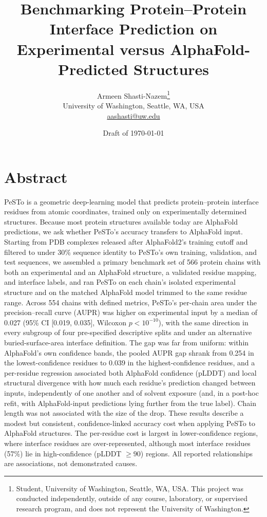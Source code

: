 \documentclass[10pt]{article}
\title{\vspace{-1.5em}\textbf{Benchmarking Protein--Protein Interface Prediction on Experimental versus AlphaFold-Predicted Structures}}
\author{Armeen Shasti-Nazem\thanks{Student, University of Washington,
Seattle, WA, USA. This project was conducted independently, outside of any
course, laboratory, or supervised research program, and does not represent
the University of Washington.}\\[2pt]
\small University of Washington, Seattle, WA, USA\\[1pt]
\small\href{mailto:aashasti@uw.edu}{aashasti@uw.edu}}
\date{\small Draft of \today}
\begin{document}
\maketitle
\thispagestyle{fancy}
\vspace{-2.2em}

\section*{Abstract}

PeSTo is a geometric deep-learning model that predicts protein--protein
interface residues from atomic coordinates, trained only on experimentally
determined structures. Because most protein structures available today are
AlphaFold predictions, we ask whether PeSTo's accuracy transfers to AlphaFold
input. Starting from PDB complexes released after AlphaFold2's training
cutoff and filtered to under 30\% sequence identity to
PeSTo's own training, validation, and test sequences, we assembled a primary
benchmark set of 566 protein chains with both an experimental and
an AlphaFold structure, a validated residue mapping, and interface labels,
and ran PeSTo on each chain's isolated experimental structure and on the
matched AlphaFold model trimmed to the same residue range. Across
554 chains with defined metrics, PeSTo's
per-chain area under the precision--recall curve (AUPR) was higher on
experimental input by a median of 0.027 (95\% CI
[0.019, 0.035], Wilcoxon $p < 10^{-10}$), with the same direction in
every subgroup of four pre-specified descriptive splits and under an
alternative buried-surface-area interface definition. The gap was far from
uniform: within AlphaFold's own confidence bands, the pooled AUPR gap shrank
from 0.254 in the lowest-confidence residues to 0.039 in the
highest-confidence residues, and a per-residue regression associated both
AlphaFold confidence (pLDDT) and local structural divergence with how much
each residue's prediction changed between inputs, independently of one
another and of solvent exposure (and, in a post-hoc refit, with
AlphaFold-input predictions lying further from the true label). Chain length was not associated with the
size of the drop. These results describe a modest but consistent,
confidence-linked accuracy cost when applying PeSTo to AlphaFold structures.
The per-residue cost is largest in lower-confidence regions, where interface
residues are over-represented, although most interface residues
(57\%) lie in high-confidence (pLDDT $\geq 90$) regions. All
reported relationships are associations, not demonstrated causes.
\end{document}
